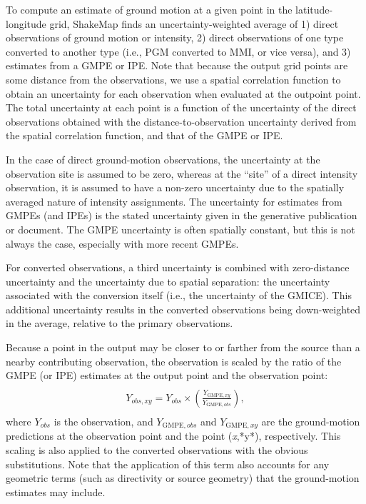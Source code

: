 \documentclass[letterpaper,10pt,english]{sphinxmanual}
\begin{document}
To compute an estimate of ground motion at a given point in the latitude-longitude grid,
ShakeMap finds an uncertainty-weighted average of 1) direct observations of ground
motion or intensity, 2) direct observations of one type converted to another type (i.e.,
PGM converted to MMI, or vice versa), and 3) estimates from a GMPE or IPE. Note that
because the output grid points are some distance from the observations, we use a spatial
correlation function to obtain an uncertainty for each observation when evaluated at the
outpoint point. The total uncertainty at each point is a function of the uncertainty of the
direct observations obtained with the distance-to-observation uncertainty derived from
the spatial correlation function, and that of the GMPE or IPE.

In the case of direct ground-motion observations, the uncertainty at the observation site is
assumed to be zero, whereas at the ``site'' of a direct intensity observation, it is assumed to
have a non-zero uncertainty due to the spatially averaged nature of intensity assignments.
The uncertainty for estimates from
GMPEs (and IPEs) is the stated uncertainty given in the generative publication or
document. The GMPE uncertainty is often spatially constant, but this is not always the
case, especially with more recent GMPEs.

For converted observations, a third uncertainty is combined with zero-distance
uncertainty and the uncertainty due to spatial separation: the uncertainty associated with
the conversion itself (i.e., the uncertainty of the GMICE). This additional uncertainty
results in the converted observations being down-weighted in the average, relative to the
primary observations.

Because a point in the output may be closer to or farther from the source than a nearby
contributing observation, the observation is scaled by the ratio of the GMPE (or IPE)
estimates at the output point and the observation point:
\label{tg_processing:equation-equation1}\begin{align}\label{tg_processing-equation1}\begin{aligned}
\begin{split}Y_{obs,xy} = Y_{obs} \times \left(\frac{Y_{\text{GMPE},xy}}{Y_{\text{GMPE},obs}}\right),\end{split}\end{aligned}\end{align}
where \(Y_{obs}\) is the observation, and \(Y_{\text{GMPE},obs}\) and \(Y_{\text{GMPE},xy}\) are the ground-motion predictions
at the observation point and the point (\emph{x},*y*), respectively. This scaling is also applied to
the converted observations with the obvious substitutions. Note that the application of
this term also accounts for any geometric terms (such as directivity or source geometry)
that the ground-motion estimates may include.
\end{document}

